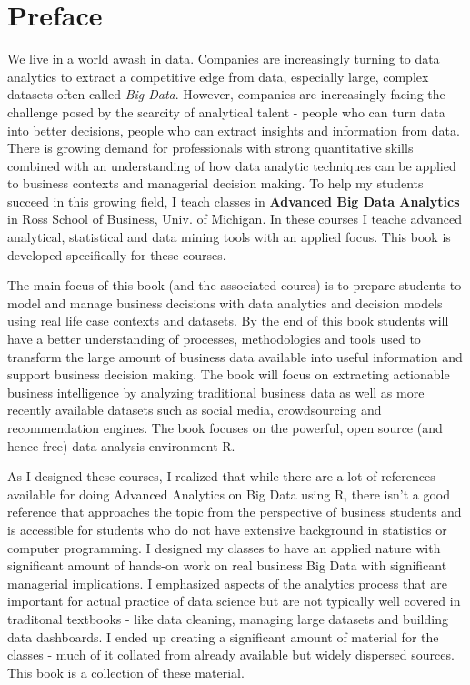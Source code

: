 \documentclass[]{krantz}
\theoremstyle{definition}
\theoremstyle{definition}
\theoremstyle{definition}
\theoremstyle{remark}
\begin{document}
\chapter*{Preface}\label{preface}


We live in a world awash in data. Companies are increasingly turning to
data analytics to extract a competitive edge from data, especially
large, complex datasets often called \emph{Big Data}. However, companies
are increasingly facing the challenge posed by the scarcity of
analytical talent - people who can turn data into better decisions,
people who can extract insights and information from data. There is
growing demand for professionals with strong quantitative skills
combined with an understanding of how data analytic techniques can be
applied to business contexts and managerial decision making. To help my
students succeed in this growing field, I teach classes in
\textbf{Advanced Big Data Analytics} in Ross School of Business, Univ.
of Michigan. In these courses I teache advanced analytical, statistical
and data mining tools with an applied focus. This book is developed
specifically for these courses.

The main focus of this book (and the associated coures) is to prepare
students to model and manage business decisions with data analytics and
decision models using real life case contexts and datasets. By the end
of this book students will have a better understanding of processes,
methodologies and tools used to transform the large amount of business
data available into useful information and support business decision
making. The book will focus on extracting actionable business
intelligence by analyzing traditional business data as well as more
recently available datasets such as social media, crowdsourcing and
recommendation engines. The book focuses on the powerful, open source
(and hence free) data analysis environment R.

As I designed these courses, I realized that while there are a lot of
references available for doing Advanced Analytics on Big Data using R,
there isn't a good reference that approaches the topic from the
perspective of business students and is accessible for students who do
not have extensive background in statistics or computer programming. I
designed my classes to have an applied nature with significant amount of
hands-on work on real business Big Data with significant managerial
implications. I emphasized aspects of the analytics process that are
important for actual practice of data science but are not typically well
covered in traditonal textbooks - like data cleaning, managing large
datasets and building data dashboards. I ended up creating a significant
amount of material for the classes - much of it collated from already
available but widely dispersed sources. This book is a collection of
these material.
\end{document}
